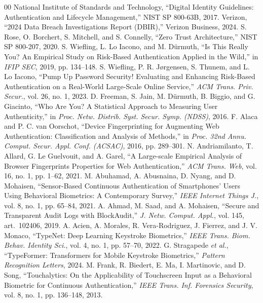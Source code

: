 \documentclass[conference]{IEEEtran}
\begin{document}
\balance
\begin{thebibliography}{00}
 National Institute of Standards and Technology, ``Digital Identity Guidelines: Authentication and Lifecycle Management,'' NIST SP 800-63B, 2017.
 Verizon, ``2024 Data Breach Investigations Report (DBIR),'' Verizon Business, 2024.
 S. Rose, O. Borchert, S. Mitchell, and S. Connelly, ``Zero Trust Architecture,'' NIST SP 800-207, 2020.
 S. Wiefling, L. Lo Iacono, and M. D\"urmuth, ``Is This Really You? An Empirical Study on Risk-Based Authentication Applied in the Wild,'' in \emph{IFIP SEC}, 2019, pp. 134--148.
 S. Wiefling, P. R. J\o rgensen, S. Thunem, and L. Lo Iacono, ``Pump Up Password Security! Evaluating and Enhancing Risk-Based Authentication on a Real-World Large-Scale Online Service,'' \emph{ACM Trans. Priv. Secur.}, vol. 26, no. 1, 2023.
 D. Freeman, S. Jain, M. D\"urmuth, B. Biggio, and G. Giacinto, ``Who Are You? A Statistical Approach to Measuring User Authenticity,'' in \emph{Proc. Netw. Distrib. Syst. Secur. Symp. (NDSS)}, 2016.
 F. Alaca and P. C. van Oorschot, ``Device Fingerprinting for Augmenting Web Authentication: Classification and Analysis of Methods,'' in \emph{Proc. 32nd Annu. Comput. Secur. Appl. Conf. (ACSAC)}, 2016, pp. 289--301.
 N. Andriamilanto, T. Allard, G. Le Guelvouit, and A. Garel, ``A Large-scale Empirical Analysis of Browser Fingerprints Properties for Web Authentication,'' \emph{ACM Trans. Web}, vol. 16, no. 1, pp. 1--62, 2021.
 M. Abuhamad, A. Abusnaina, D. Nyang, and D. Mohaisen, ``Sensor-Based Continuous Authentication of Smartphones' Users Using Behavioral Biometrics: A Contemporary Survey,'' \emph{IEEE Internet Things J.}, vol. 8, no. 1, pp. 65--84, 2021.
 A. Ahmad, M. Saad, and A. Mohaisen, ``Secure and Transparent Audit Logs with BlockAudit,'' \emph{J. Netw. Comput. Appl.}, vol. 145, art.\ 102406, 2019.
 A. Acien, A. Morales, R. Vera-Rodriguez, J. Fierrez, and J. V. Monaco, ``TypeNet: Deep Learning Keystroke Biometrics,'' \emph{IEEE Trans. Biom. Behav. Identity Sci.}, vol. 4, no. 1, pp. 57--70, 2022.
 G. Stragapede \emph{et al.}, ``TypeFormer: Transformers for Mobile Keystroke Biometrics,'' \emph{Pattern Recognition Letters}, 2024.
 M. Frank, R. Biedert, E. Ma, I. Martinovic, and D. Song, ``Touchalytics: On the Applicability of Touchscreen Input as a Behavioral Biometric for Continuous Authentication,'' \emph{IEEE Trans. Inf. Forensics Security}, vol. 8, no. 1, pp. 136--148, 2013.

\end{thebibliography}
\end{document}
